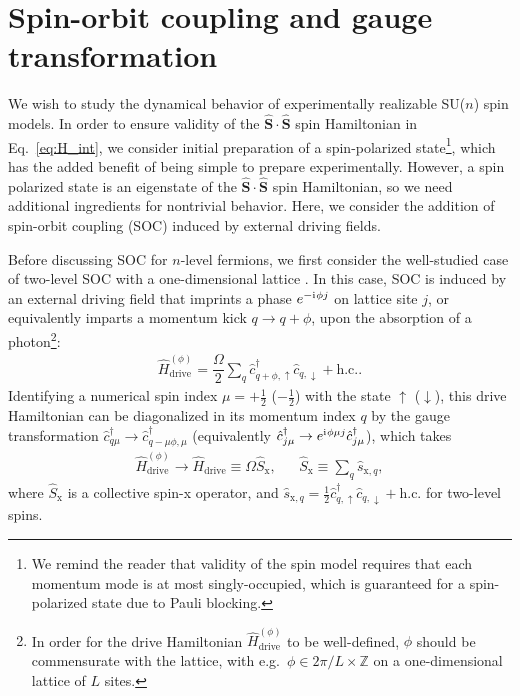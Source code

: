 \documentclass[aps,pra,nofootinbib,twocolumn,superscriptaddress]{revtex4-2}
\renewcommand{\t}{\text} %
\newcommand{\f}[2]{\dfrac{#1}{#2}} %
\renewcommand{\v}{\bm} %
\renewcommand{\i}{\mathrm{i}\mkern1mu} %
\newcommand{\1}{\mathds{1}}
\renewcommand{\c}{\hat c}
\newcommand{\s}{\hat s}
\renewcommand{\H}{\hat H}
\renewcommand{\S}{\hat S}
\newcommand{\up}{\uparrow}
\newcommand{\dn}{\downarrow}
\newcommand{\x}{\text{x}}
\newcommand{\ZZ}{\mathbb{Z}}
\begin{document}
\section{Spin-orbit coupling and gauge transformation}
\label{sec:SOC}

We wish to study the dynamical behavior of experimentally realizable SU($n$) spin models.
In order to ensure validity of the $\v\S\cdot\v\S$ spin Hamiltonian in Eq.~\eqref{eq:H_int}, we consider initial preparation of a spin-polarized state\footnote{We remind the reader that validity of the spin model requires that each momentum mode is at most singly-occupied, which is guaranteed for a spin-polarized state due to Pauli blocking.}, which has the added benefit of being simple to prepare experimentally.
However, a spin polarized state is an eigenstate of the $\v\S\cdot\v\S$ spin Hamiltonian, so we need additional ingredients for nontrivial behavior.
Here, we consider the addition of spin-orbit coupling (SOC) induced by external driving fields.

Before discussing SOC for $n$-level fermions, we first consider the well-studied case of two-level SOC with a one-dimensional lattice \cite{wall2016synthetic, kolkowitz2016spinorbitcoupled, bromley2018dynamics, he2019engineering}.
In this case, SOC is induced by an external driving field that imprints a phase $e^{-\i\phi j}$ on lattice site $j$, or equivalently imparts a momentum kick $q\to q+\phi$, upon the absorption of a photon\footnote{In order for the drive Hamiltonian $\H_{\t{drive}}^{(\phi)}$ to be well-defined, $\phi$ should be commensurate with the lattice, with e.g.~$\phi\in2\pi/L\times\ZZ$ on a one-dimensional lattice of $L$ sites.}:
\begin{align}
  \H_{\t{drive}}^{(\phi)}
  = \f{\Omega}{2} \sum_q \c_{q+\phi,\up}^\dag \c_{q,\dn} + \t{h.c.}.
  \label{eq:drive_2}
\end{align}
Identifying a numerical spin index $\mu=+\frac12$ ($-\frac12$) with the state $\up$ ($\dn$), this drive Hamiltonian can be diagonalized in its momentum index $q$ by the gauge transformation $\c_{q\mu}^\dag\to \c_{q-\mu\phi,\mu}^\dag$ (equivalently $\c_{j\mu}^\dag\to e^{\i\phi\mu j} \c_{j\mu}^\dag$), which takes
\begin{align}
  \H_{\t{drive}}^{(\phi)} \to \H_{\t{drive}} \equiv \Omega \S_\x,
  &&
  \S_\x \equiv \sum_q \s_{\x,q},
  \label{eq:drive_trans}
\end{align}
where $\S_\x$ is a collective spin-x operator, and $\s_{\x,q}=\frac12 \c_{q,\up}^\dag \c_{q,\dn} + \t{h.c.}$ for two-level spins.
\end{document}
